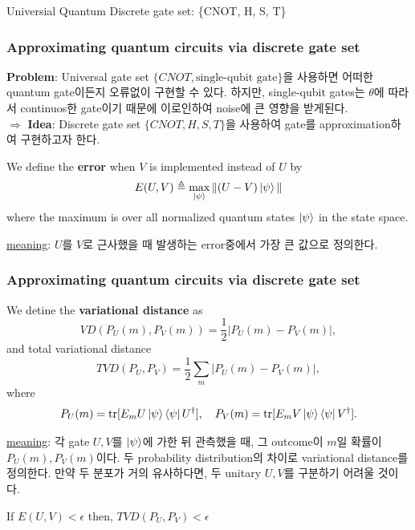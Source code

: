 \documentclass[9pt]{beamer}
\begin{document}
    \begin{section}{Universial Quantum Discrete gate set: \{CNOT, H, S, T\}}
        

        \begin{frame}
            \frametitle{Approximating quantum circuits via discrete gate set}
                \textbf{Problem}: Universal gate set $\{CNOT, \text{single-qubit gate}\}$을 사용하면 어떠한 quantum gate이든지 오류없이 구현할 수 있다. 하지만, single-qubit gates는 $\theta$에 따라서 continuos한 gate이기 때문에 이로인하여 noise에 큰 영향을 받게된다.
                \vspace{0.2cm}
                \\ $ \Rightarrow $ \textbf{Idea}: Discrete gate set $\{CNOT, H, S, T\}$을 사용하여 gate를 \alert{approximation}하여 구현하고자 한다.
                \vspace{0.5cm}
                \begin{definition}\label{def:error}
                    We define the \textbf{error} when $V$ is implemented instead of $U$ by
                    $$E(U,V) \triangleq \max_{\ket{\psi}} \|(U-V) \ket{\psi}\|$$
                    where the maximum is over all normalized quantum states $\ket{\psi}$ in the state space.
                \end{definition}
                \vspace{0.2cm}
                \checkmark \underline{meaning}: $U$를 $V$로 근사했을 때 발생하는 error중에서 가장 큰 값으로 정의한다.
            
        
        \end{frame}

        \begin{frame}
            \frametitle{Approximating quantum circuits via discrete gate set}
                \begin{definition}\label{def:vari-dist}
                    We detine the \textbf{variational distance} as 
                    $$VD(P_U(m), P_V(m)) = \frac{1}{2} |P_U(m) - P_V(m)|,$$
                    and total variational distance 
                    $$TVD(P_U, P_V) = \frac{1}{2} \sum_m |P_U(m) - P_V(m) |,$$
                    where 
                    $$P_U (m) = \text{tr}[E_m U\ket \psi \bra \psi U^\dagger],\quad P_V (m) = \text{tr}[E_m V\ket \psi \bra \psi V^\dagger].$$
                \end{definition}
                \vspace{0.2cm}
                \checkmark \underline{meaning}: 각 gate $U, V$를 $\ket{\psi}$에 가한 뒤 관측했을 때, 그 outcome이 $m$일 확률이 $P_U(m), P_V(m)$이다. 두 probability distribution의 차이로 variational distance를 정의한다. 만약 두 분포가 거의 유사하다면, 두 unitary $U, V$를 구분하기 어려울 것이다. 
                \vspace{0.2cm}
                \begin{corollary}
                    If $E(U, V) < \epsilon$ then, $TVD(P_U, P_V) < \epsilon$
                \end{corollary}            
        

\end{frame}
\end{section}
\end{document}
